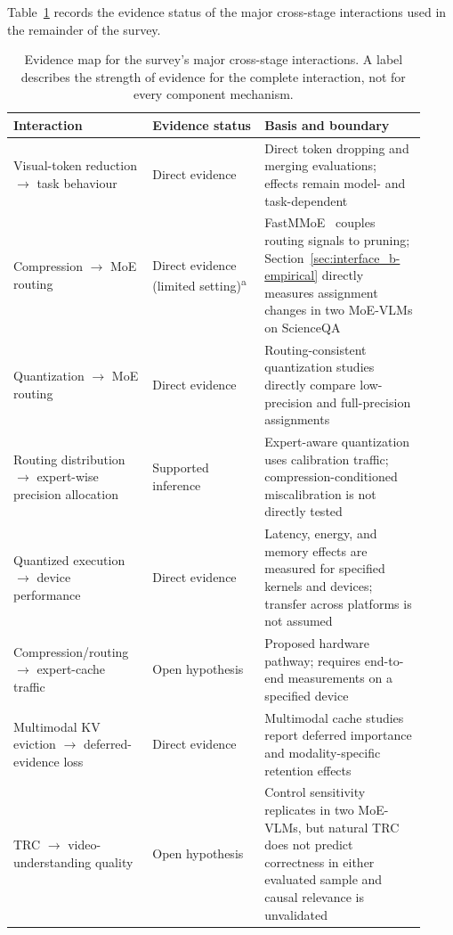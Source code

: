 \documentclass[10pt]{article}
\newenvironment{reviewchange}{\begingroup\color{red}}{\endgroup}
\begin{document}
\begin{reviewchange}
Table~\ref{tab:evidence-map} records the evidence status of the major
cross-stage interactions used in the remainder of the survey.

\begin{table}[t]
\centering
\caption{Evidence map for the survey's major cross-stage interactions.  A label
describes the strength of evidence for the complete interaction, not for every
component mechanism.}
\label{tab:evidence-map}
\small
\renewcommand{\arraystretch}{1.12}
\setlength{\tabcolsep}{4pt}
\begin{tabular}{p{0.31\linewidth} p{0.25\linewidth} p{0.36\linewidth}}
\toprule
\textbf{Interaction} & \textbf{Evidence status} & \textbf{Basis and boundary} \\
\midrule
Visual-token reduction $\rightarrow$ task behaviour & Direct evidence & Direct token dropping and merging evaluations; effects remain model- and task-dependent \\
Compression $\rightarrow$ MoE routing & Direct evidence (limited setting)\textsuperscript{a} & FastMMoE~\citep{xia2025fastmmoe} couples routing signals to pruning; Section~\ref{sec:interface_b-empirical} directly measures assignment changes in two MoE-VLMs on ScienceQA \\
Quantization $\rightarrow$ MoE routing & Direct evidence & Routing-consistent quantization studies directly compare low-precision and full-precision assignments \\
Routing distribution $\rightarrow$ expert-wise precision allocation & Supported inference & Expert-aware quantization uses calibration traffic; compression-conditioned miscalibration is not directly tested \\
Quantized execution $\rightarrow$ device performance & Direct evidence & Latency, energy, and memory effects are measured for specified kernels and devices; transfer across platforms is not assumed \\
Compression/routing $\rightarrow$ expert-cache traffic & Open hypothesis & Proposed hardware pathway; requires end-to-end measurements on a specified device \\
Multimodal KV eviction $\rightarrow$ deferred-evidence loss & Direct evidence & Multimodal cache studies report deferred importance and modality-specific retention effects \\
TRC $\rightarrow$ video-understanding quality & Open hypothesis & Control sensitivity replicates in two MoE-VLMs, but natural TRC does not predict correctness in either evaluated sample and causal relevance is unvalidated \\
\bottomrule
\end{tabular}
\vspace{2pt}


\end{table}
\end{reviewchange}
\end{document}
